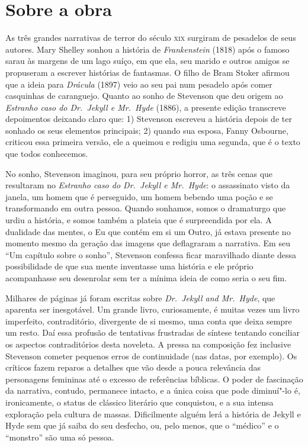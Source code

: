 \section{Sobre a obra}

As três grandes narrativas de terror do século \textsc{xix} surgiram de
pesadelos de seus autores.  Mary Shelley sonhou a história de
\textit{Frankenstein} (1818) após o famoso sarau às margens de um lago
suíço, em que ela, seu marido e outros amigos se propuseram a escrever
histórias de fantasmas.  O filho de Bram Stoker afirmou que a ideia
para \textit{Drácula} (1897) veio ao seu pai num pesadelo após comer
casquinhas de caranguejo.  Quanto ao sonho de Stevenson que deu origem
ao \textit{Estranho caso do Dr.~Jekyll e Mr.~Hyde} (1886), a presente
edição transcreve depoimentos deixando claro que: 1) Stevenson escreveu
a história depois de ter sonhado os seus elementos principais; 2)
quando sua esposa, Fanny Osbourne, criticou essa primeira versão, ele a       
queimou e redigiu uma segunda, que é o texto que todos conhecemos.

No sonho, Stevenson imaginou, para seu próprio horror, as três cenas que
resultaram no \textit{Estranho caso do Dr.~Jekyll e Mr.~Hyde}: o
assassinato visto da janela, um homem que é perseguido, um homem
bebendo uma poção e se transformando em outra pessoa. Quando sonhamos,
somos o dramaturgo que urdiu a história, e somos também a plateia que é
surpreendida por ela.  A dualidade das mentes, o Eu que contém em si um
Outro, já estava presente no momento mesmo da geração das imagens que
deflagraram a narrativa.  Em seu “Um capítulo sobre o sonho”, Stevenson
confessa ficar maravilhado diante dessa possibilidade de que sua mente
inventasse uma história e ele próprio acompanhasse seu desenrolar sem
ter a mínima ideia de como seria o seu fim.


Milhares de páginas já foram escritas sobre \textit{Dr.~Jekyll and Mr.~Hyde}, 
que aparenta ser inesgotável. Um grande livro, curiosamente, é muitas 
vezes um livro imperfeito, contraditório, divergente de si mesmo, uma 
conta que deixa sempre um resto.  Daí essa profusão de tentativas frustradas 
de síntese tentando conciliar os aspectos contraditórios desta noveleta.  
A pressa na composição fez inclusive Stevenson cometer pequenos erros de 
continuidade (nas datas, por exemplo). Os críticos fazem reparos a detalhes 
que vão desde a pouca relevância das personagens femininas até o excesso de 
referências bíblicas.  O poder de fascinação da narrativa, contudo, permanece 
intacto, e a única coisa que pode diminuí"-lo é, ironicamente, o status de clássico 
literário que conquistou, e a sua intensa exploração pela cultura de massas. 
Dificilmente alguém lerá a história de Jekyll e Hyde sem que já saiba do seu desfecho, 
ou, pelo menos, que o “médico” e o “monstro” são uma só pessoa.

